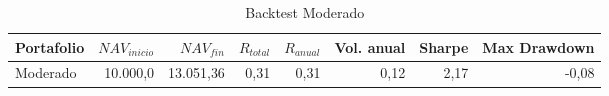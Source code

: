 \begin{table}[htbp]
\centering
\begin{tabular}{lrrrrrrr}
\hline
Portafolio & $NAV_{inicio}$ & $NAV_{fin}$ & $R_{total}$ & $R_{anual}$ & Vol. anual & Sharpe & Max Drawdown \\
\hline
Moderado & 10{.}000{,}0 & 13{.}051{,}36 & 0{,}31 & 0{,}31 & 0{,}12 & 2{,}17 & -0{,}08 \\
\hline
\end{tabular}
\caption{Backtest Moderado}
\label{tab:backtest-moderate}
\end{table}